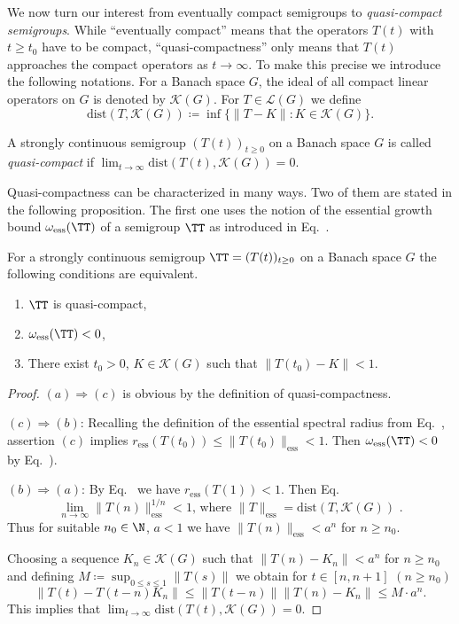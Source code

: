 We now turn our interest from eventually compact semigroups to \emph{quasi-compact semigroups}.
While \enquote{eventually compact} means that the operators $T(t)$ with $t \geq t_{0}$ have to be compact, \enquote{quasi-compactness} only
means that $T(t)$ approaches the compact operators as $t \to \infty$.
To make this precise we introduce the following notations.
For a Banach space $G$, the ideal of all compact linear operators on $G$ is denoted by $\mathcal{K}(G)$.
For $T \in \mathcal{L}(G)$ we define
%
\[
	\text{dist}(T,\mathcal{K}(G))  \coloneq  \inf\{\|T - K\| \colon K \in \mathcal{K}(G)\} .
\]
\begin{definition}\label{def:b4-2.7}
	A strongly continuous semigroup $(T(t))_{t \geq 0}$ on a Banach
	space $G$ is called \emph{quasi-compact} if\/ $\lim_{t\to\infty}\text{dist}(T(t),\mathcal{K}(G)) = 0$.
\end{definition}
Quasi-compactness can be characterized in many ways.
Two of them are stated in the following proposition.
The first one uses the notion of the essential growth bound $\omega_{\text{ess}}(\TT)$ of a semigroup $\TT$ as introduced in Eq.~. 
\begin{proposition}\label{prop:b4-2.8}
	For a strongly continuous semigroup $\TT = (T(t))_{t \geq 0}$
	on a Banach space $G$ the following conditions are equivalent.
	\begin{enumerate}[\upshape (a)]
		\item
		$\TT$ is quasi-compact,
	
		\item 
		$\omega_{\text{ess}}(\TT) < 0$,
	
		\item 
		There exist $t_{0} > 0$, $K \in \mathcal{K}(G)$ such that $\|T(t_{0}) - K\| < 1$.
	\end{enumerate}
\end{proposition}
\begin{proof}
$(a) \Rightarrow (c)$ is obvious by the definition of quasi-compactness.

$(c) \Rightarrow (b)$: Recalling the definition of the essential spectral radius from 
 Eq.~,
assertion $(c)$ implies 
$r_{\text{ess}}(T(t_0)) \leq \|T(t_0)\|_{\text{ess}} < 1 .$ 
Then  $\omega_{\text{ess}}(\TT) < 0 $ by  
Eq.~).

$(b) \Rightarrow (a)$: By 
 Eq.~
we have $r_{\text{ess}}(T(1)) < 1$. 
Then 
 Eq.~
\[
\text{
$\lim_{n \to \infty}\|T(n)\|_{\text{ess}}^{1/n} < 1$,  where $\|T\|_{\text{ess}} = \mathrm{dist}(T,\mathcal{K}(G))$ .}
\]
Thus for suitable $n_{0} \in \N$, $a < 1$ we have $\|T(n)\|_{\text{ess}} < a^n$ for $n \geq n_{0}$.

Choosing a sequence $K_n \in \mathcal{K}(G)$ such that $\|T(n) - K_n\| < a^n$ for $n \geq n_{0}$ and defining $M \coloneqq \sup_{0 \leq s \leq 1}\|T(s)\|$ we obtain for $t \in [n,n+1]$ $(n \geq n_{0})$ 
\[
\|T(t) - T(t-n)K_n\| \leq \|T(t-n)\|\|T(n) - K_n\| \leq M \cdot a^n .
\] 
This implies that $\lim_{t \to \infty}\mathrm{dist}(T(t),\mathcal{K}(G)) = 0 .$
\end{proof}

